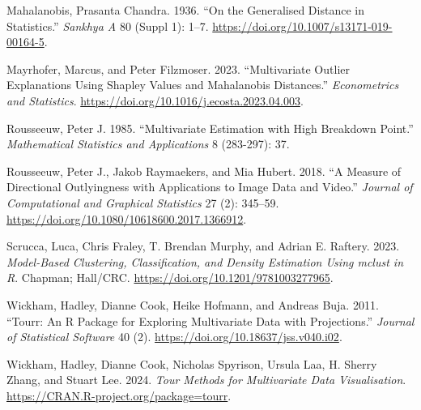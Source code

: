 \documentclass[
  12pt,
]{interact}
\newlength{\cslhangindent}
\newenvironment{CSLReferences}[2] %
 {\begin{list}{}{%
  \setlength{\itemindent}{0pt}
  \setlength{\leftmargin}{0pt}
  \setlength{\parsep}{0pt}
  \ifodd #1
   \setlength{\leftmargin}{\cslhangindent}
   \setlength{\itemindent}{-1\cslhangindent}
  \fi
  \setlength{\itemsep}{#2\baselineskip}}}
 {\end{list}}
\begin{document}
\begin{CSLReferences}{1}{0}
Mahalanobis, Prasanta Chandra. 1936. {``On the Generalised Distance in
Statistics.''} \emph{Sankhya A} 80 (Suppl 1): 1--7.
\url{https://doi.org/10.1007/s13171-019-00164-5}.

Mayrhofer, Marcus, and Peter Filzmoser. 2023. {``Multivariate Outlier
Explanations Using Shapley Values and Mahalanobis Distances.''}
\emph{Econometrics and Statistics}.
\url{https://doi.org/10.1016/j.ecosta.2023.04.003}.

Rousseeuw, Peter J. 1985. {``Multivariate Estimation with High Breakdown
Point.''} \emph{Mathematical Statistics and Applications} 8 (283-297):
37.

Rousseeuw, Peter J., Jakob Raymaekers, and Mia Hubert. 2018. {``A
Measure of Directional Outlyingness with Applications to Image Data and
Video.''} \emph{Journal of Computational and Graphical Statistics} 27
(2): 345--59. \url{https://doi.org/10.1080/10618600.2017.1366912}.

Scrucca, Luca, Chris Fraley, T. Brendan Murphy, and Adrian E. Raftery.
2023. \emph{Model-Based Clustering, Classification, and Density
Estimation Using {mclust} in {R}}. Chapman; Hall/CRC.
\url{https://doi.org/10.1201/9781003277965}.

Wickham, Hadley, Dianne Cook, Heike Hofmann, and Andreas Buja. 2011.
{``Tourr: {An} {R} {Package} for {Exploring} {Multivariate} {Data} with
{Projections}.''} \emph{Journal of Statistical Software} 40 (2).
\url{https://doi.org/10.18637/jss.v040.i02}.

Wickham, Hadley, Dianne Cook, Nicholas Spyrison, Ursula Laa, H. Sherry
Zhang, and Stuart Lee. 2024. \emph{Tour Methods for Multivariate Data
Visualisation}. \url{https://CRAN.R-project.org/package=tourr}.

\end{CSLReferences}
\end{document}
